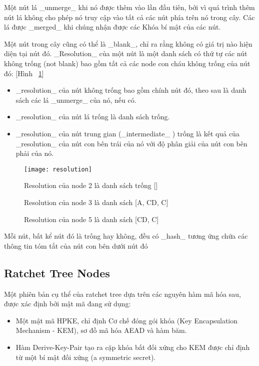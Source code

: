 \documentclass[../main-report.tex]{subfiles}
\begin{document}
Một nút lá \_unmerge\_ khi nó được thêm vào lần đầu tiên, bởi vì quá trình thêm nút lá không cho phép nó truy cập vào tất cả các nút phía trên nó trong cây. Các lá được \_merged\_ khi chúng nhận được các Khóa bí mật của các nút.

Một nút trong cây cũng có thể là \_blank\_, chỉ ra rằng không có giá trị nào hiện diện tại nút đó. \_Resolution\_ của một nút là một danh sách có thứ tự các nút không trống (not blank) bao gồm tất cả các node con cháu không trống của nút đó: [Hình ~\ref{fig:resolution}]

\begin{itemize}
\item{\_resolution\_ của nút không trống bao gồm chính nút đó, theo sau là danh sách các lá \_unmerge\_ của nó, nếu có.}\item{\_resolution\_ của nút lá trống là danh sách trống.}
\item{\_resolution\_ của nút trung gian (\_intermediate\_ ) trống là kết quả của \_resolution\_ của nút con bên trái của
nó với độ phân giải của nút con bên phải của nó.}
\end{itemize} 

\begin{figure}[!h]
\begin{center}
\label{fig:resolution}
\texttt{[image: resolution]}
\caption{Resolution của node 5 là danh sách [CD, C]}

{Resolution của node 2 là danh sách trống []}

{Resolution của node 3 là danh sách [A, CD, C]}
\end{center}
\end{figure}

Mỗi nút, bất kể nút đó là trống hay không, đều có \_hash\_ tương ứng chứa các thông tin tóm tắt của nút con bên dưới nút đó


\subsection{Ratchet Tree Nodes}
Một phiên bản cụ thể của ratchet tree dựa trên các nguyên hàm mã hóa sau, được xác định bởi mật mã đang sử dụng:

\begin{itemize}
\item{Một mật mã HPKE, chỉ định Cơ chế đóng gói khóa (Key Encapsulation Mechanism - KEM), sơ đồ mã hóa AEAD và hàm băm.}
\item{Hàm Derive-Key-Pair tạo ra cặp khóa bất đối xứng cho KEM được chỉ định từ một bí mật đối xứng (a symmetric secret).}
\end{itemize} 
\end{document}
